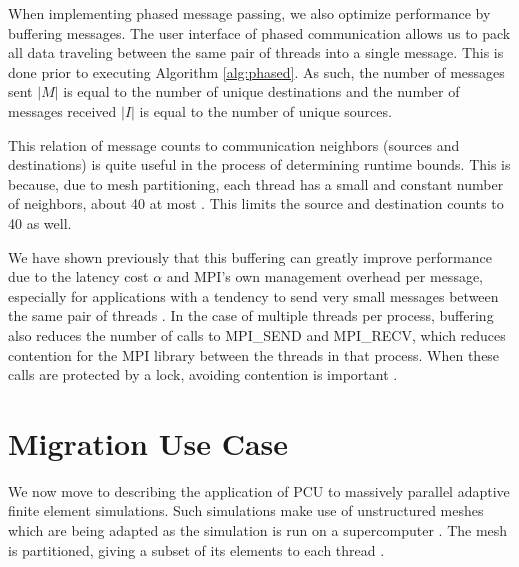 \documentclass[final,1p,times]{elsarticle}
\begin{document}
When implementing phased message passing, we also optimize performance
by buffering messages.
The user interface of phased communication allows us to pack
all data traveling between the same pair of threads into a single message.
This is done prior to executing Algorithm \ref{alg:phased}.
As such, the number of messages sent $|M|$ is equal to the number of unique
destinations and the number of messages received $|I|$ is equal to the number
of unique sources.

This relation of message counts to communication neighbors (sources and
destinations) is quite useful in the process of determining runtime bounds.
This is because, due to mesh partitioning, each thread has a small
and constant number of neighbors,
about 40 at most \cite{zhou2010petascale}.
This limits the source and destination counts to 40 as well.

We have shown previously that this buffering can greatly improve performance
due to the latency cost $\alpha$ and MPI's own management overhead per message,
especially for applications
with a tendency to send very small messages between the same pair of threads
\cite{Ovcharenko2012140}.
In the case of multiple threads per process, buffering also reduces
the number of calls to MPI\_SEND and MPI\_RECV, which reduces
contention for the MPI library between the threads in that process.
When these calls are protected by a lock, avoiding contention is important
\cite{mavriplis2002parallel}.

\section{Migration Use Case}
\label{sec:migrate}

We now move to describing the application of PCU to massively parallel
adaptive finite element simulations.
Such simulations make use of unstructured meshes which are
being adapted as the simulation is run on a supercomputer 
\cite{Gal10,rasquin2014scalable,Zhou-flow}.
The mesh is partitioned, giving a subset of its elements to each thread 
\cite{rasquin2014scalable,zhou2012unstructured,Zhou-ewc}.
\end{document}
